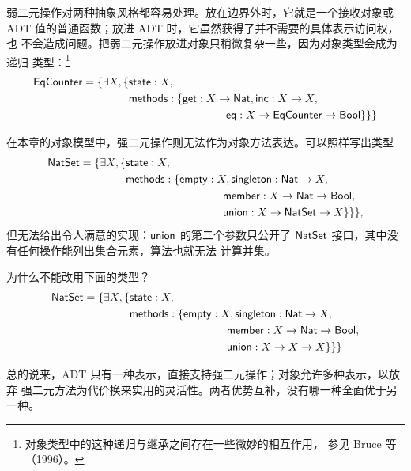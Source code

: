 弱二元操作对两种抽象风格都容易处理。放在边界外时，它就是一个接收对象或
ADT 值的普通函数；放进 ADT 时，它虽然获得了并不需要的具体表示访问权，也
不会造成问题。把弱二元操作放进对象只稍微复杂一些，因为对象类型会成为递归
类型：\footnote{对象类型中的这种递归与继承之间存在一些微妙的相互作用，
参见 Bruce 等（1996）。}
\[
\begin{aligned}
\tapltype{EqCounter}=\{\exists X,\{&\taplterm{state}:X,\\
&\taplterm{methods}:\{\taplterm{get}:X\to\tapltype{Nat},
\taplterm{inc}:X\to X,\\
&\hspace{31mm}
\taplterm{eq}:X\to\tapltype{EqCounter}\to\tapltype{Bool}\}\}\}
\end{aligned}
\]

在本章的对象模型中，强二元操作则无法作为对象方法表达。可以照样写出类型
\[
\begin{aligned}
\tapltype{NatSet}=\{\exists X,\{&\taplterm{state}:X,\\
&\taplterm{methods}:\{\taplterm{empty}:X,
\taplterm{singleton}:\tapltype{Nat}\to X,\\
&\hspace{31mm}
\taplterm{member}:X\to\tapltype{Nat}\to\tapltype{Bool},\\
&\hspace{31mm}
\taplterm{union}:X\to\tapltype{NatSet}\to X\}\}\},
\end{aligned}
\]
但无法给出令人满意的实现：\(\mathsf{union}\) 的第二个参数只公开了
\(\mathsf{NatSet}\) 接口，其中没有任何操作能列出集合元素，算法也就无法
计算并集。

\begin{exercise}[\(\star\)]
\label{ex:24.2.5}
为什么不能改用下面的类型？
\[
\begin{aligned}
\tapltype{NatSet}=\{\exists X,\{&\taplterm{state}:X,\\
&\taplterm{methods}:\{\taplterm{empty}:X,
\taplterm{singleton}:\tapltype{Nat}\to X,\\
&\hspace{31mm}
\taplterm{member}:X\to\tapltype{Nat}\to\tapltype{Bool},\\
&\hspace{31mm}
\taplterm{union}:X\to X\to X\}\}\}
\end{aligned}
\]
\end{exercise}

总的说来，ADT 只有一种表示，直接支持强二元操作；对象允许多种表示，以放弃
强二元方法为代价换来实用的灵活性。两者优势互补，没有哪一种全面优于另一种。

